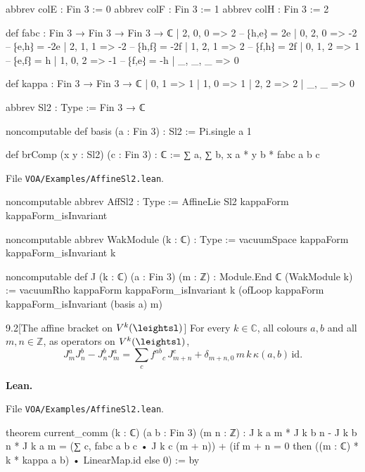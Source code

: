 \documentclass[11pt,openany]{book}
\newcommand{\lean}[1]{\texttt{\detokenize{#1}}}
\newcommand{\leanpath}[1]{\texttt{\small #1}}
\theoremstyle{definition}
\theoremstyle{plain}
\newcommand{\C}{{\mathbb{C}}}
\newcommand{\Z}{{\mathbb{Z}}}
\begin{document}
\begin{leancode}
abbrev colE : Fin 3 := 0
abbrev colF : Fin 3 := 1
abbrev colH : Fin 3 := 2

def fabc : Fin 3 → Fin 3 → Fin 3 → ℂ
  | 2, 0, 0 => 2    -- ⁅h,e⁆ = 2e
  | 0, 2, 0 => -2   -- ⁅e,h⁆ = -2e
  | 2, 1, 1 => -2   -- ⁅h,f⁆ = -2f
  | 1, 2, 1 => 2    -- ⁅f,h⁆ = 2f
  | 0, 1, 2 => 1    -- ⁅e,f⁆ = h
  | 1, 0, 2 => -1   -- ⁅f,e⁆ = -h
  | _, _, _ => 0

def kappa : Fin 3 → Fin 3 → ℂ
  | 0, 1 => 1
  | 1, 0 => 1
  | 2, 2 => 2
  | _, _ => 0

abbrev Sl2 : Type := Fin 3 → ℂ

noncomputable def basis (a : Fin 3) : Sl2 := Pi.single a 1

def brComp (x y : Sl2) (c : Fin 3) : ℂ := ∑ a, ∑ b, x a * y b * fabc a b c
\end{leancode}
{\raggedright\noindent File \leanpath{VOA/\allowbreak Examples/\allowbreak AffineSl2.lean}.\par}
\begin{leancode}
noncomputable abbrev AffSl2 : Type := AffineLie Sl2 kappaForm kappaForm_isInvariant

noncomputable abbrev WakModule (k : ℂ) : Type :=
  vacuumSpace kappaForm kappaForm_isInvariant k

noncomputable def J (k : ℂ) (a : Fin 3) (m : ℤ) : Module.End ℂ (WakModule k) :=
  vacuumRho kappaForm kappaForm_isInvariant k (ofLoop kappaForm kappaForm_isInvariant (basis a) m)
\end{leancode}
\medskip
\begin{btheorem}{9.2}[The affine bracket on $V^k(\leightsl)$]
For every $k\in\C$, all colours $a,b$ and all $m,n\in\Z$, as operators on $V^k(\leightsl)$,
\begin{equation*}
  J^a_mJ^b_n - J^b_nJ^a_m = \sum_c f^{ab}{}_c\,J^c_{m+n} + \delta_{m+n,0}\,m\,k\,\kappa(a,b)\,\mathrm{id}.
\end{equation*}
\end{btheorem}
{\raggedright\noindent\textbf{Lean.} \lean{VOA.}\allowbreak\lean{AffineVOA.}\allowbreak\lean{current_comm}\par}
{\raggedright\noindent File \leanpath{VOA/\allowbreak Examples/\allowbreak AffineSl2.lean}.\par}
\begin{leancode}
theorem current_comm (k : ℂ) (a b : Fin 3) (m n : ℤ) :
    J k a m * J k b n - J k b n * J k a m
      = (∑ c, fabc a b c • J k c (m + n))
        + (if m + n = 0 then ((m : ℂ) * k * kappa a b) • LinearMap.id else 0) := by
\end{leancode}
\end{document}
